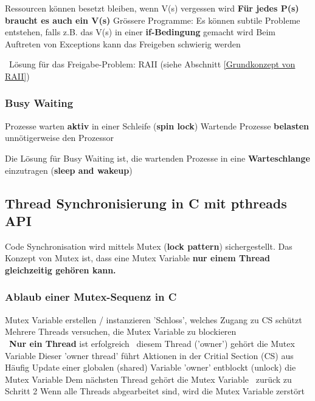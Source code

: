 \begin{outline}
    \1 Ressourcen können besetzt bleiben, wenn V(s) vergessen wird
        \2 \textbf{Für jedes P(s) braucht es auch ein V(s)}
    \1 Grössere Programme: Es können subtile Probleme entstehen, falls z.B. das V(s) in einer \textbf{if-Bedingung} gemacht wird
    \1 Beim Auftreten von Exceptions kann das Freigeben schwierig werden
\end{outline}

\vspace{0.1cm}

\textrightarrow\ Lösung für das Freigabe-Problem: RAII (siehe Abschnitt \ref{Grundkonzept von RAII})


\subsubsection{Busy Waiting}

\begin{outline}
    \1 Prozesse warten \textbf{aktiv} in einer Schleife (\textbf{spin lock})
        \2 Wartende Prozesse \textbf{belasten} unnötigerweise den Prozessor
\end{outline}

\vspace{0.1cm}

Die Lösung für Busy Waiting ist, die wartenden Prozesse in eine \textbf{Warteschlange} einzutragen (\textbf{sleep and wakeup})


\subsection{Thread Synchronisierung in C mit pthreads API}

Code Synchronisation wird mittels Mutex (\textbf{lock pattern}) sichergestellt. 
Das Konzept von Mutex ist, dass eine Mutex Variable \textbf{nur einem Thread gleichzeitig gehören kann.}


\subsubsection{Ablaub einer Mutex-Sequenz in C}

\begingroup
\renewcommand{\outlinei}{enumerate}
\renewcommand{\outlineii}{itemize}
\begin{outline}
    \1 Mutex Variable erstellen / instanzieren
        \2 'Schloss', welches Zugang zu CS schützt
    \1 Mehrere Threads versuchen, die Mutex Variable zu blockieren \\
        \textrightarrow\ \textbf{Nur ein Thread} ist erfolgreich \textrightarrow\ diesem Thread ('owner') gehört die Mutex Variable 
    \1 Dieser 'owner thread' führt Aktionen in der Critial Section (CS) aus
        \2 Häufig Update einer globalen (shared) Variable
    \1 'owner' entblockt (unlock) die Mutex Variable
    \1 Dem nächsten Thread gehört die Mutex Variable \textrightarrow\ zurück zu Schritt 2
    \1 Wenn alle Threads abgearbeitet sind, wird die Mutex Variable zerstört
\end{outline}
\endgroup


